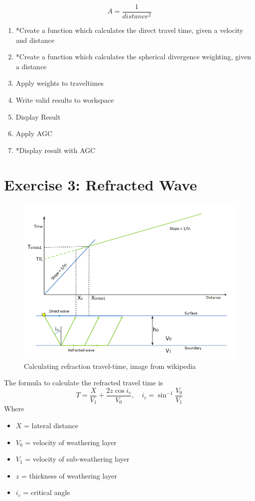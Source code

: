 \documentclass[a4paper, 10pt]{article}
\begin{document}
\[ A = \frac{1}{distance^2}\]

\begin{enumerate}
\item *Create a function which calculates the direct travel time, given a velocity and distance
\item *Create a function which calculates the spherical divergence weighting, given a distance
\item Apply weights to traveltimes
\item Write valid results to workspace
\item Display Result
\item Apply AGC
\item *Display result with AGC
\end{enumerate}

\newpage
\section*{Exercise 3: Refracted Wave}
\begin{figure}[h]
\centering
\includegraphics[scale=0.5]{800px-Refraction_2layers.png}
\caption{Calculating refraction travel-time, image from wikipedia}
\end{figure}
The formula to calculate the refracted travel time is 
\[T = \frac{X}{V_1} + \frac{2z \cos{i_c}}{V_0}, \quad i_c = \sin^{-1}{\frac{V_0}{V_1}} \]
Where
\begin{itemize}
\item $X$ = lateral distance
\item $V_0$ = velocity of weathering layer
\item $V_1$ = velocity of sub-weathering layer
\item $z$ = thickness of weathering layer
\item $i_c$ = critical angle
\end{itemize}
\end{document}
